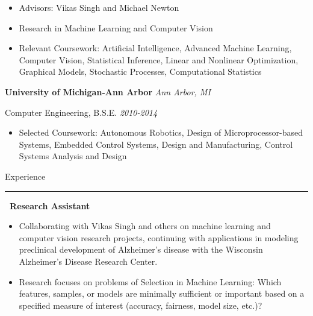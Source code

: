 \documentclass[]{article}
\begin{document}
	\vspace{-5pt}
	\begin{itemize}[label={$\bullet$}]
		\item Advisors: Vikas Singh and Michael Newton
		\item Research in Machine Learning and Computer Vision
		\item Relevant Coursework: Artificial Intelligence, Advanced Machine Learning, Computer Vision, Statistical Inference, Linear and Nonlinear Optimization, Graphical Models, Stochastic Processes, Computational Statistics
	\end{itemize}
 {{\bf\large University of Michigan-Ann Arbor} \hfill \textit{Ann Arbor, MI} }
 
	{ Computer Engineering, B.S.E. \hfill \textit{2010-2014} }
	
	\vspace{-5pt}
	\begin{itemize}[label={$\bullet$}]
		\item Selected Coursework: Autonomous Robotics, Design of Microprocessor-based Systems, Embedded Control Systems, Design and Manufacturing, Control Systems Analysis and Design
	\end{itemize}

\vspace{15pt}
{\LARGE Experience}
\hrule
\vspace{10pt}

 \newline
{\bf \ Research Assistant}
\begin{itemize}[label={$\bullet$}]
	\item Collaborating with Vikas Singh and others on machine learning and computer vision research projects, continuing with applications in modeling preclinical development of Alzheimer's disease with the Wisconsin Alzheimer's Disease Research Center.
	\item Research focuses on problems of Selection in Machine Learning: Which features, samples, or models are minimally sufficient or important based on a specified measure of interest (accuracy, fairness, model size, etc.)?
\end{itemize} 
\end{document}
